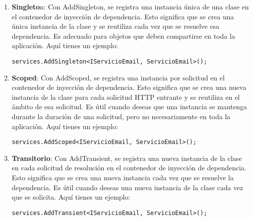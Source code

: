 \documentclass[executivepaper]{article}
\begin{document}
\begin{enumerate}
    \item \textbf{Singleto}n: Con AddSingleton, se registra una instancia única de una clase en el contenedor de inyección de dependencia. Esto significa que se crea una única instancia de la clase y se reutiliza cada vez que se resuelve esa dependencia. Es adecuado para objetos que deben compartirse en toda la aplicación. Aquí tienes un ejemplo:
    \begin{lstlisting}
services.AddSingleton<IServicioEmail, ServicioEmail>();
\end{lstlisting}
    \item \textbf{Scoped}: Con AddScoped, se registra una instancia por solicitud en el contenedor de inyección de dependencia. Esto significa que se crea una nueva instancia de la clase para cada solicitud HTTP entrante y se reutiliza en el ámbito de esa solicitud. Es útil cuando deseas que una instancia se mantenga durante la duración de una solicitud, pero no necesariamente en toda la aplicación. Aquí tienes un ejemplo:
    \begin{lstlisting}
services.AddScoped<IServicioEmail, ServicioEmail>();
\end{lstlisting}
    \item \textbf{Transitorio}: Con AddTransient, se registra una nueva instancia de la clase en cada solicitud de resolución en el contenedor de inyección de dependencia. Esto significa que se crea una nueva instancia cada vez que se resuelve la dependencia. Es útil cuando deseas una nueva instancia de la clase cada vez que se solicita. Aquí tienes un ejemplo:
    \begin{lstlisting}
services.AddTransient<IServicioEmail, ServicioEmail>();
\end{lstlisting}
\end{enumerate}
\end{document}
